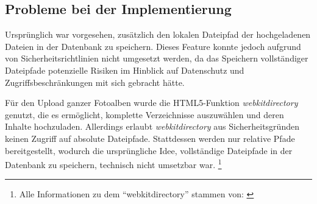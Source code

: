 \subsection{Probleme bei der Implementierung}
\label{subsection:implementation-problems-resumable-upload}

Ursprünglich war vorgesehen, zusätzlich den lokalen Dateipfad der hochgeladenen 
Dateien in der Datenbank zu speichern. Dieses Feature konnte jedoch aufgrund von 
Sicherheitsrichtlinien nicht umgesetzt werden, da das Speichern vollständiger 
Dateipfade potenzielle Risiken im Hinblick auf Datenschutz und Zugriffsbeschränkungen 
mit sich gebracht hätte.

Für den Upload ganzer Fotoalben wurde die HTML5-Funktion \emph{webkitdirectory} genutzt, 
die es ermöglicht, komplette Verzeichnisse auszuwählen und deren Inhalte hochzuladen. 
Allerdings erlaubt \emph{webkitdirectory} aus Sicherheitsgründen keinen Zugriff auf absolute 
Dateipfade. Stattdessen werden nur relative Pfade bereitgestellt, wodurch die 
ursprüngliche Idee, vollständige Dateipfade in der Datenbank zu speichern, technisch 
nicht umsetzbar war. \footnote{Alle Informationen zu dem ``webkitdirectory'' stammen von: \cite{MozillaFoundation}}

